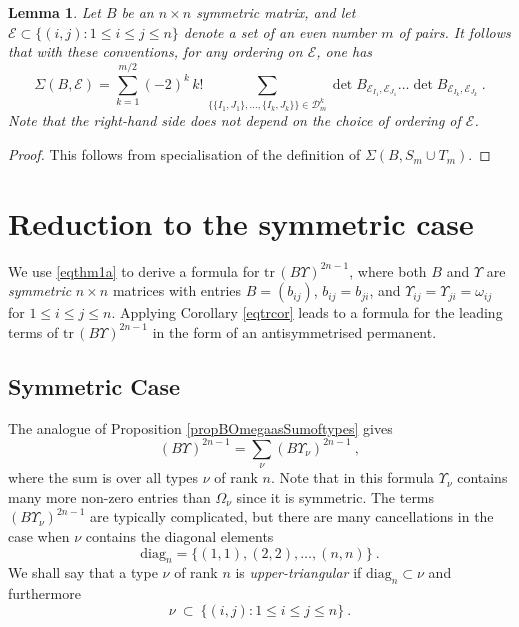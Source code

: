 \documentclass[10pt]{amsart}
\newcommand{\sE}{\mathcal{E}}
\newcommand{\tr}{\mathrm{tr}\,}
\newcommand{\diag}{\mathrm{diag}}
\theoremstyle{plain}
\newtheorem{lem}[thm]{Lemma}
\newcommand{\0}{\color{blue}{\mathsf{0}}}
\begin{document}
\begin{lem} \label{lem: SigmaBspecialise} Let $B$ be an $n\times n$ symmetric matrix, and let $\sE \subset \{(i,j): 1\leq i\leq j\leq n\}$ denote a set of an even number $m$ of pairs. 
It follows that with these conventions, for any ordering on $\sE$, one has 
\begin{equation}\label{Sigmadef1}
\Sigma(B,\sE) =  \sum_{k=1}^{m/2}   (-2)^k\,  k! \,     \sum_{  \{\{I_1,J_1\} , \ldots, \{ I_k, J_k\} \} \in \mathcal{D}^k_{m}  }   \det B_{\sE_{I_1}, \sE_{J_1}} \ldots \det B_{\sE_{I_k}, \sE_{J_k}}\ .
\end{equation}
Note that the right-hand side does not depend on the choice of ordering of $\sE$. 
\end{lem}
\begin{proof}This follows from specialisation of the definition of $\Sigma(B,{S_{m}\cup T_{m}}).$
\end{proof}

\section{Reduction to the symmetric case}\label{sectsymbi}
We use   \eqref{eqthm1a} to derive a formula for $\tr(B \Upsilon)^{2n-1}$, where both $B$ and  $\Upsilon$ are   \emph{symmetric}   $n\times n$ matrices  with entries $B=(b_{ij})$, $b_{ij}=b_{ji}$,  and $\Upsilon_{ij}=\Upsilon_{ji}=\omega_{ij}$ for $1\leq i\leq j \leq n$.  Applying Corollary \ref{eqtrcor} leads to a formula for the leading terms of $\tr(B \Upsilon)^{2n-1}$ in the form of an antisymmetrised permanent.


\subsection{Symmetric Case} 

The analogue of Proposition \ref{propBOmegaasSumoftypes} gives 
\begin{equation} \label{BUpsilonSumoverTypes}
(B \Upsilon)^{2n-1} = \sum_{\nu}  (B\Upsilon_{\nu})^{2n-1}\ , 
\end{equation}
where the sum is over all types $\nu$ of rank $n$. Note that in this formula $\Upsilon_{\nu}$  
contains many more non-zero entries than $\Omega_{\nu}$ since it is symmetric. 
The terms $(B\Upsilon_{\nu})^{2n-1}$ are  typically complicated, but there are many cancellations in the case when $\nu$ contains the diagonal elements
\begin{equation}\label{eqdiag}
\diag_n  = \{ (1,1), (2,2), \ldots, (n,n) \}  \ .
\end{equation}
We shall say that a type $\nu$ of rank $n$ is \emph{upper-triangular} if $\diag_n \subset \nu$ and  furthermore 
\begin{equation} \label{nuisUT} \nu \ \subset \  \{(i,j): 1\leq i\leq j\leq n\}  \ . \end{equation}
\end{document}

